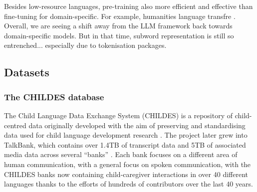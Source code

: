 


Besides low-resource languages, pre-training also more efficient and effective than fine-tuning for domain-specific. For example, humanities language transfre \citep{fittschen2025pretraininglanguagemodelsdiachronic}. Overall, we are seeing a shift away from the LLM framework back towards domain-specific models. But in that time, subword representation is still so entrenched... especially due to tokenisation packages. 

\subsection{Datasets}

\subsubsection{The CHILDES database}


The Child Language Data Exchange System (CHILDES) is a repository of child-centred data originally developed with the aim of preserving and standardising data used for child language development research \citep{macwhinney1985child}. The project later grew into TalkBank, which contains over 1.4TB of transcript data and 5TB of associated media data across several ``banks'' \citep{macwhinney_understanding_2019}. Each bank focuses on a different area of human communication, with a general focus on spoken communication, with the CHILDES banks now containing child-caregiver interactions in over 40 different languages thanks to the efforts of hundreds of contributors over the last 40 years. 

